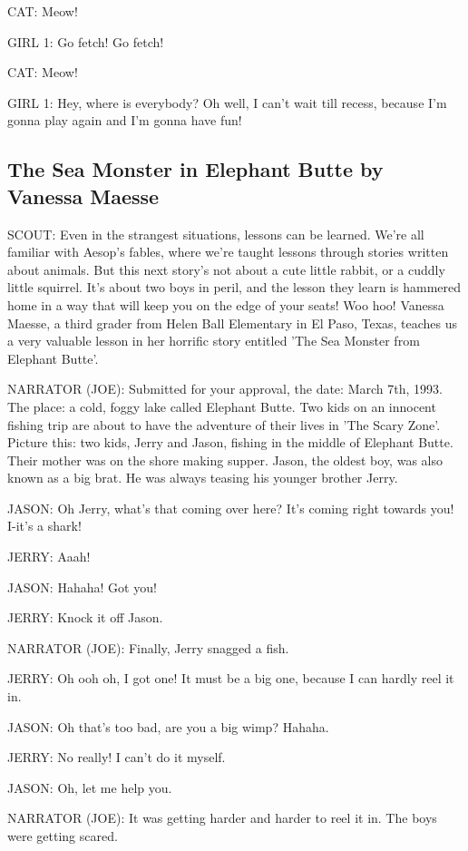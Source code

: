 CAT:
Meow!

GIRL 1:
Go fetch!
Go fetch!

CAT:
Meow!

GIRL 1:
Hey, where is everybody?
Oh well, I can't wait till recess, because I'm gonna play again and I'm gonna have fun!

\subsection{The Sea Monster in Elephant Butte by Vanessa Maesse}

SCOUT:
Even in the strangest situations, lessons can be learned.
We're all familiar with Aesop's fables, where we're taught lessons through stories written about animals.
But this next story's not about a cute little rabbit, or a cuddly little squirrel.
It's about two boys in peril, and the lesson they learn is hammered home in a way that will keep you on the edge of your seats!
Woo hoo!
Vanessa Maesse, a third grader from Helen Ball Elementary in El Paso, Texas, teaches us a very valuable lesson in her horrific story entitled 'The Sea Monster from Elephant Butte'.

NARRATOR (JOE):
Submitted for your approval, the date: March 7th, 1993.
The place: a cold, foggy lake called Elephant Butte.
Two kids on an innocent fishing trip are about to have the adventure of their lives in 'The Scary Zone'.
Picture this: two kids, Jerry and Jason, fishing in the middle of Elephant Butte.
Their mother was on the shore making supper.
Jason, the oldest boy, was also known as a big brat.
He was always teasing his younger brother Jerry.

JASON:
Oh Jerry, what's that coming over here?
It's coming right towards you!
I-it's a shark!

JERRY:
Aaah!

JASON:
Hahaha!
Got you!

JERRY:
Knock it off Jason.

NARRATOR (JOE):
Finally, Jerry snagged a fish.

JERRY:
Oh ooh oh, I got one!
It must be a big one, because I can hardly reel it in.

JASON:
Oh that's too bad, are you a big wimp?
Hahaha.

JERRY:
No really!
I can't do it myself.

JASON:
Oh, let me help you.

NARRATOR (JOE):
It was getting harder and harder to reel it in.
The boys were getting scared.

